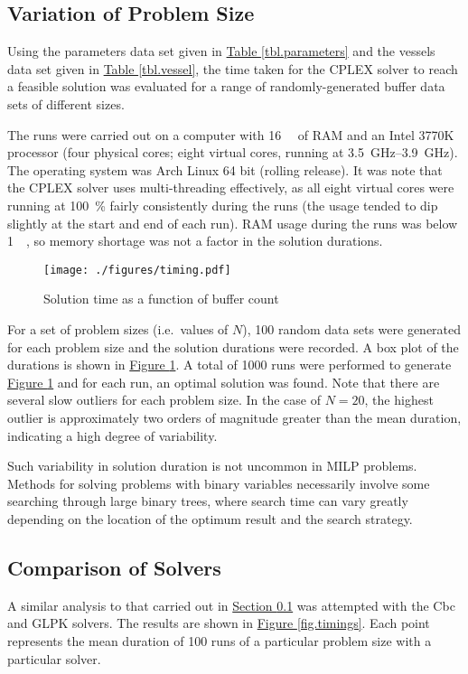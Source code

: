 \subsection{Variation of Problem Size}\label{SS.buffcount}
Using the parameters data set given in 
\hyperref[tbl.parameters]{Table \ref*{tbl.parameters}} and the vessels data set
given in \hyperref[tbl.vessel]{Table \ref*{tbl.vessel}}, the time taken for
the CPLEX solver to reach a feasible solution was evaluated for a range of 
randomly-generated buffer data sets of different sizes.

The runs were carried out on a computer with \SI{16}{\giga\byte} of RAM and an
Intel 3770K processor (four physical cores; eight virtual cores, running at
\SIrange{3.5}{3.9}{\GHz}).
The operating system was Arch Linux 64 bit (rolling release).
It was note that the CPLEX solver uses multi-threading effectively, as all
eight virtual cores were running at \SI{100}{\%} fairly consistently during the
runs (the usage tended to dip slightly at the start and end of each run).
RAM usage during the runs was below \SI{1}{\giga\byte}, so memory shortage was
not a factor in the solution durations.

\begin{figure}
    \label{fig.timing}
    \centering
    \texttt{[image: ./figures/timing.pdf]}
    \caption{Solution time as a function of buffer count}
\end{figure}

For a set of problem sizes (i.e.\ values of $N$), 100 random data sets
were generated for each problem size and the solution durations were recorded.
A box plot of the durations is shown in 
\hyperref[fig.timing]{Figure \ref*{fig.timing}}.
A total of \num{1000} runs were performed to generate
\hyperref[fig.timing]{Figure \ref*{fig.timing}} and for each run, an optimal
solution was found.
Note that there are several slow outliers for each problem size.
In the case of $N=20$, the highest outlier is approximately two
orders of magnitude greater than the mean duration, indicating a high degree
of variability.

Such variability in solution duration is not uncommon in MILP problems.
Methods for solving problems with binary variables necessarily involve some
searching through large binary trees, where search time can vary greatly
depending on the location of the optimum result and the search strategy.

\subsection{Comparison of Solvers}\label{SS.solvers}
A similar analysis to that carried out in
\hyperref[SS.buffcount]{Section \ref*{SS.buffcount}} was attempted with the
Cbc and GLPK solvers.
The results are shown in \hyperref[fig.timings]{Figure \ref*{fig.timings}}.
Each point represents the mean duration of 100 runs of a particular problem
size with a particular solver.

